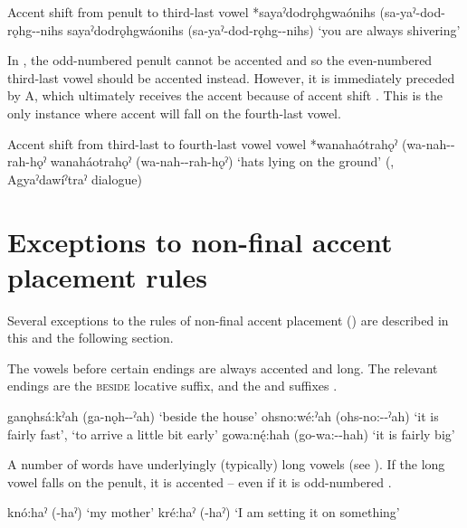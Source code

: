 \ea\label{ex:nonfinacex7} Accent shift from penult to third-last vowel
\ea {} *sayaˀdodrǫhgwaónihs (sa-yaˀ-dod-rǫhg--nihs\label{ex:nonfinacex7a}
\ex {} sayaˀdodrǫhgwáonihs (sa-yaˀ-dod-rǫhg--nihs) ‘you are always shivering’ \label{ex:nonfinacex7b}
\z
\z 

In , the odd-numbered penult cannot be accented and so the even-numbered third-last vowel should be accented instead. However, it is immediately preceded by A, which ultimately receives the accent because of accent shift . This is the only instance where accent will fall on the fourth-last vowel.

\ea\label{ex:nonfinacex700} Accent shift from third-last to fourth-last vowel vowel
\ea {} *wanahaótrahǫˀ (wa-nah--rah-hǫˀ \label{ex:nonfinacex700a}
\ex {} wanaháotrahǫˀ (wa-nah--rah-hǫˀ) ‘hats lying on the ground’ (\cite[225]{mithun_watewayestanih_1984}, Agyaˀdawíˀtraˀ dialogue)\label{ex:nonfinacex700b} 
\z
\z 


\section{Exceptions to non-final accent placement rules} \label{ch:Exceptions to non-final accent placement rules}
Several exceptions to the rules of non-final accent placement () are described in this and the following section. 

The vowels before certain endings are always accented and long. The relevant endings are the  \textsc{beside} locative suffix, and the  and  {\diminutive} suffixes .

\ea\label{ex:nonfinacex12}
\ea ganǫhsá:kˀah (ga-nǫh--ˀah) ‘beside the house’ 
\ex ohsno:wé:ˀah (ohs-no:--ˀah) ‘it is fairly fast’, ‘to arrive a little bit early’
\ex gowa:nę́:hah (go-wa:--hah) ‘it is fairly big’ 
\z
\z

A number of words have underlyingly (typically) long vowels (see ). If the long vowel falls on the penult, it is accented -- even if it is odd-numbered .

\ea\label{ex:nonfinacex13} 
\ea knó:haˀ (-haˀ) ‘my mother’
\ex kré:haˀ (-haˀ) ‘I am setting it on something’ 
\z
\z

